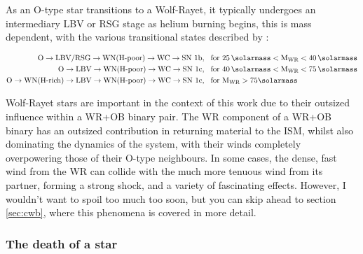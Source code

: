 
As an O-type star transitions to a Wolf-Rayet, it typically undergoes an intermediary LBV or RSG stage as helium burning begins, this is mass dependent, with the various transitional states described by \cite{crowther_physical_2007}:

\begin{subequations}
  \begin{align*}
    \text{O} \rightarrow \text{LBV/RSG} \rightarrow \text{WN(H-poor)} \rightarrow \text{WC} \rightarrow \text{SN 1b} & ,~~ \text{for } 25 \, \si{\solarmass} < \text{M}_{\text{WR}} < 40 \, \si{\solarmass} \\
    \text{O} \rightarrow \text{LBV} \rightarrow \text{WN(H-poor)} \rightarrow \text{WC} \rightarrow \text{SN 1c} & ,~~ \text{for } 40 \, \si{\solarmass} < \text{M}_{\text{WR}} < 75 \, \si{\solarmass} \\
    \text{O} \rightarrow \text{WN(H-rich)} \rightarrow \text{LBV} \rightarrow \text{WN(H-poor)} \rightarrow \text{WC} \rightarrow \text{SN 1c} & ,~~ \text{for } \text{M}_{\text{WR}} > 75 \si{\solarmass} 
  \end{align*}  
\end{subequations}




Wolf-Rayet stars are important in the context of this work due to their outsized influence within a WR+OB binary pair.
The WR component of a WR+OB binary has an outsized contribution in returning material to the ISM, whilst also dominating the dynamics of the system, with their winds completely overpowering those of their O-type neighbours.
In some cases, the dense, fast wind from the WR can collide with the much more tenuous wind from its partner, forming a strong shock, and a variety of fascinating effects.
However, I wouldn't want to spoil too much too soon, but you can skip ahead to section \ref{sec:cwb}, where this phenomena is covered in more detail.

\subsubsection{The death of a star}

